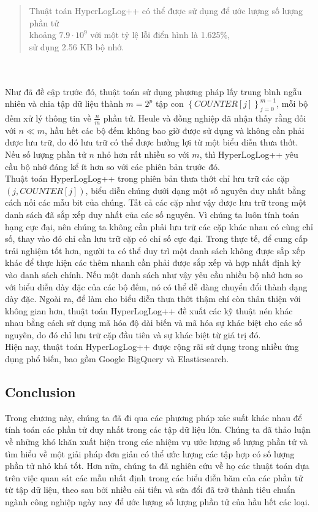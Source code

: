 \documentclass[a4paper,13pt]{article}
\theoremstyle{mytheor}
\begin{document}
\begin{quote}
    Thuật toán HyperLogLog++ có thể được sử dụng để ước lượng số lượng phần tử \\
    khoảng $7.9 \cdot 10^9$ với một tỷ lệ lỗi điển hình là 1.625\%, \\
    sử dụng 2.56 KB bộ nhớ.
    \vspace{0.25cm}
\end{quote}
\\\\
\indent Như đã đề cập trước đó, thuật toán sử dụng phương pháp lấy trung bình ngẫu nhiên và chia tập dữ liệu thành $m = 2^p$ tập con $\left\{COUNTER[j]\right\}_{j=0}^{m-1}$, 
mỗi bộ đếm xử lý thông tin về $\frac{n}{m}$ phần tử. Heule và đồng nghiệp đã nhận thấy rằng đối với $n \ll m$, hầu hết các bộ đếm không bao giờ được 
sử dụng và không cần phải được lưu trữ, do đó lưu trữ có thể được hưởng lợi từ một biểu diễn thưa thớt. Nếu số lượng phần tử $n$ nhỏ hơn rất nhiều 
so với $m$, thì HyperLogLog++ yêu cầu bộ nhớ đáng kể ít hơn so với các phiên bản trước đó.\\
\indent Thuật toán HyperLogLog++ trong phiên bản thưa thớt chỉ lưu trữ các cặp $(j, COUNTER[j])$, biểu diễn chúng dưới dạng một số nguyên duy nhất 
bằng cách nối các mẫu bit của chúng. Tất cả các cặp như vậy được lưu trữ trong một danh sách đã sắp xếp duy nhất của các số nguyên. 
Vì chúng ta luôn tính toán hạng cực đại, nên chúng ta không cần phải lưu trữ các cặp khác nhau có cùng chỉ số, thay vào đó chỉ cần lưu trữ cặp 
có chỉ số cực đại.
Trong thực tế, để cung cấp trải nghiệm tốt hơn, người ta có thể duy trì một danh sách không được sắp xếp khác để thực hiện các thêm nhanh 
cần phải được sắp xếp và hợp nhất định kỳ vào danh sách chính. Nếu một danh sách như vậy yêu cầu nhiều bộ nhớ hơn so với biểu diễn dày đặc 
của các bộ đếm, nó có thể dễ dàng chuyển đổi thành dạng dày đặc. Ngoài ra, để làm cho biểu diễn thưa thớt thậm chí còn thân thiện với không gian hơn, 
thuật toán HyperLogLog++ đề xuất các kỹ thuật nén khác nhau bằng cách sử dụng mã hóa độ dài biến và mã hóa sự khác biệt cho các số nguyên, 
do đó chỉ lưu trữ cặp đầu tiên và sự khác biệt từ giá trị đó.\\
\indent Hiện nay, thuật toán HyperLogLog++ được rộng rãi sử dụng trong nhiều ứng dụng phổ biến, bao gồm Google BigQuery và Elasticsearch.
\subsection*{Conclusion}
Trong chương này, chúng ta đã đi qua các phương pháp xác suất khác nhau để tính toán các phần tử duy nhất trong các tập dữ liệu lớn. 
Chúng ta đã thảo luận về những khó khăn xuất hiện trong các nhiệm vụ ước lượng số lượng phần tử và tìm hiểu về một giải pháp đơn giản có thể ước lượng 
các tập hợp có số lượng phần tử nhỏ khá tốt. Hơn nữa, chúng ta đã nghiên cứu về họ các thuật toán dựa trên việc quan sát các mẫu nhất định trong 
các biểu diễn băm của các phần tử từ tập dữ liệu, theo sau bởi nhiều cải tiến và sửa đổi đã trở thành tiêu chuẩn ngành công nghiệp ngày nay để 
ước lượng số lượng phần tử của hầu hết các loại.\\
\end{document}
